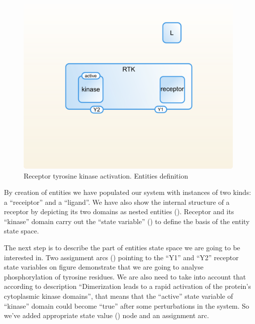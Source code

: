 \begin{figure}[H]
  \centering
  \vspace*{-0.75em}
  \includegraphics[scale=0.75]{examples/rtk-entities.png}
   \caption{Receptor tyrosine kinase activation. Entities definition}
  \label{fig:rtk-entities}
\end{figure}

By creation of entities we have populated our system with instances of two kinds: a ``receiptor'' and a ``ligand''. We have also show the internal structure of a receptor by depicting its two domains as nested entities (). Receptor and its ``kinase'' domain carry out the ``state variable'' () to define the basis of the entity state space.

The next step is to describe the part of entities state space we are going to be interested in. Two assignment arcs () pointing to the ``Y1'' and ``Y2'' receptor state variables on figure  demonstrate that we are going to analyse phosphorylation of tyrosine residues. We are also need to take into account that according to description ``Dimerization leads to a rapid activation of the protein's cytoplasmic kinase domains'', that means that the ``active'' state variable of ``kinase'' domain could become ``true'' after some perturbations in the system. So we've added appropriate state value () node and an assignment arc.

